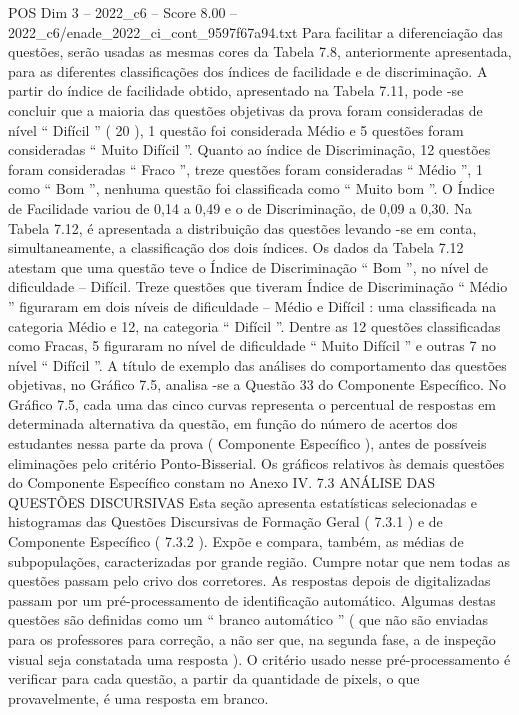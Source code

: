 \begin{textsample}{POS Dim 3 – 2022\_c6 – Score 8.00 – 2022\_c6/enade\_2022\_ci\_cont\_9597f67a94.txt}
Para facilitar a diferenciação das questões, serão usadas as mesmas cores da Tabela 7.8, anteriormente apresentada, para as diferentes classificações dos índices de facilidade e de discriminação.
A partir do índice de facilidade obtido, apresentado na Tabela 7.11, pode -se concluir que a maioria das questões objetivas da prova foram consideradas de nível “ Difícil ” ( 20 ), 1 questão foi considerada Médio e 5 questões foram consideradas “ Muito Difícil ”.
Quanto ao índice de Discriminação, 12 questões foram consideradas “ Fraco ”, treze questões foram consideradas “ Médio ”, 1 como “ Bom ”, nenhuma questão foi classificada como “ Muito bom ”.
O Índice de Facilidade variou de 0,14 a 0,49 e o de Discriminação, de 0,09 a 0,30.
Na Tabela 7.12, é apresentada a distribuição das questões levando -se em conta, simultaneamente, a classificação dos dois índices.
Os dados da Tabela 7.12 atestam que uma questão teve o Índice de Discriminação “ Bom ”, no nível de dificuldade – Difícil.
Treze questões que tiveram Índice de Discriminação “ Médio ” figuraram em dois níveis de dificuldade – Médio e Difícil : uma classificada na categoria Médio e 12, na categoria “ Difícil ”.
Dentre as 12 questões classificadas como Fracas, 5 figuraram no nível de dificuldade “ Muito Difícil ” e outras 7 no nível “ Difícil ”.
A título de exemplo das análises do comportamento das questões objetivas, no Gráfico 7.5, analisa -se a Questão 33 do Componente Específico.
No Gráfico 7.5, cada uma das cinco curvas representa o percentual de respostas em determinada alternativa da questão, em função do número de acertos dos estudantes nessa parte da prova ( Componente Específico ), antes de possíveis eliminações pelo critério Ponto-Bisserial.
Os gráficos relativos às demais questões do Componente Específico constam no Anexo IV. 7.3 ANÁLISE DAS QUESTÕES DISCURSIVAS Esta seção apresenta estatísticas selecionadas e histogramas das Questões Discursivas de Formação Geral ( 7.3.1 ) e de Componente Específico ( 7.3.2 ).
Expõe e compara, também, as médias de subpopulações, caracterizadas por grande região.
Cumpre notar que nem todas as questões passam pelo crivo dos corretores.
As respostas depois de digitalizadas passam por um pré-processamento de identificação automático.
Algumas destas questões são definidas como um “ branco automático ” ( que não são enviadas para os professores para correção, a não ser que, na segunda fase, a de inspeção visual seja constatada uma resposta ).
O critério usado nesse pré-processamento é verificar para cada questão, a partir da quantidade de pixels, o que provavelmente, é uma resposta em branco.

\end{textsample}
